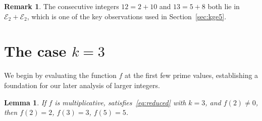 \documentclass[11pt,a4paper]{amsart}
\newcommand{\E}{\mathcal{E}}
\theoremstyle{plain}
\newtheorem{lemma}[theorem]{Lemma}
\theoremstyle{definition}
\newtheorem{remark}[theorem]{Remark}
\begin{document}
\begin{remark}
The consecutive integers $12 = 2+10$ and $13 = 5+8$ both lie in
$\E_2 + \E_2$, which is one of the key observations used in Section~\ref{sec:kge5}.
\end{remark}

\section{The case \texorpdfstring{$k = 3$}{k=3}}\label{sec:k3}
We begin by evaluating the function $f$ at the first few prime values, establishing a foundation for our later analysis of larger integers.
\begin{lemma}\label{lem:k3-base}
If $f$ is multiplicative, satisfies~\eqref{eq:reduced} with $k = 3$, and $f(2) \neq 0$, then $f(2) = 2$, $f(3) = 3$, $f(5) = 5$.
\end{lemma}
\end{document}
